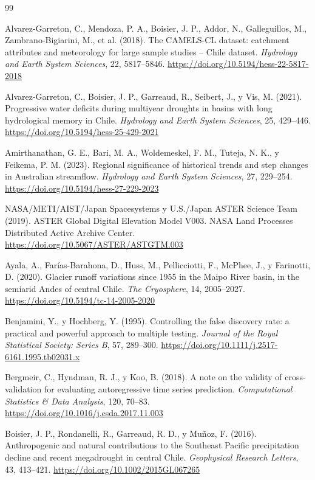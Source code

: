 \documentclass[11pt,a4paper]{article}
\begin{document}
\begin{thebibliography}{99}\small
\setlength{\itemsep}{1pt}

 Alvarez-Garreton, C., Mendoza, P. A., Boisier, J. P., Addor, N., Galleguillos, M., Zambrano-Bigiarini, M., et al. (2018). The CAMELS-CL dataset: catchment attributes and meteorology for large sample studies -- Chile dataset. \emph{Hydrology and Earth System Sciences}, 22, 5817--5846. \url{https://doi.org/10.5194/hess-22-5817-2018}

 Alvarez-Garreton, C., Boisier, J. P., Garreaud, R., Seibert, J., y Vis, M. (2021). Progressive water deficits during multiyear droughts in basins with long hydrological memory in Chile. \emph{Hydrology and Earth System Sciences}, 25, 429--446. \url{https://doi.org/10.5194/hess-25-429-2021}

 Amirthanathan, G. E., Bari, M. A., Woldemeskel, F. M., Tuteja, N. K., y Feikema, P. M. (2023). Regional significance of historical trends and step changes in Australian streamflow. \emph{Hydrology and Earth System Sciences}, 27, 229--254. \url{https://doi.org/10.5194/hess-27-229-2023}

 NASA/METI/AIST/Japan Spacesystems y U.S./Japan ASTER Science Team (2019). ASTER Global Digital Elevation Model V003. NASA Land Processes Distributed Active Archive Center. \url{https://doi.org/10.5067/ASTER/ASTGTM.003}

 Ayala, A., Farías-Barahona, D., Huss, M., Pellicciotti, F., McPhee, J., y Farinotti, D. (2020). Glacier runoff variations since 1955 in the Maipo River basin, in the semiarid Andes of central Chile. \emph{The Cryosphere}, 14, 2005--2027. \url{https://doi.org/10.5194/tc-14-2005-2020}

 Benjamini, Y., y Hochberg, Y. (1995). Controlling the false discovery rate: a practical and powerful approach to multiple testing. \emph{Journal of the Royal Statistical Society: Series B}, 57, 289--300. \url{https://doi.org/10.1111/j.2517-6161.1995.tb02031.x}

 Bergmeir, C., Hyndman, R. J., y Koo, B. (2018). A note on the validity of cross-validation for evaluating autoregressive time series prediction. \emph{Computational Statistics \& Data Analysis}, 120, 70--83. \url{https://doi.org/10.1016/j.csda.2017.11.003}

 Boisier, J. P., Rondanelli, R., Garreaud, R. D., y Muñoz, F. (2016). Anthropogenic and natural contributions to the Southeast Pacific precipitation decline and recent megadrought in central Chile. \emph{Geophysical Research Letters}, 43, 413--421. \url{https://doi.org/10.1002/2015GL067265}


\end{thebibliography}
\end{document}
